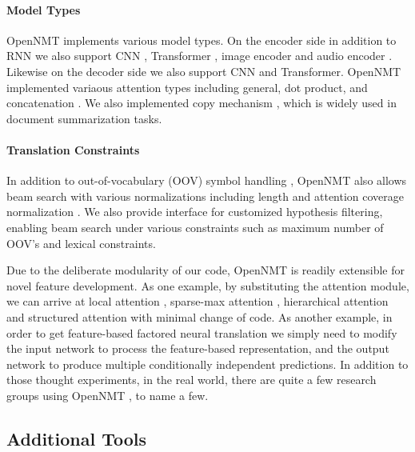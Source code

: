 \documentclass[]{article}
\begin{document}
\paragraph{Model Types} OpenNMT implements various model types. On the encoder side in addition to RNN we also support CNN \citep{gehring2017convolutional}, Transformer \citep{vaswani2017attention}, image encoder \citep{DBLP:conf/conll/BowmanVVDJB16,DBLP:journals/corr/DengKR16} and audio encoder \citep{DBLP:journals/corr/ChanJLV15}. Likewise on the decoder side we also support CNN and Transformer. OpenNMT implemented variaous attention types including general, dot product, and concatenation \citep{luong2015effective,britz2017massive}.
We also implemented copy mechanism \citep{vinyals2015pointer,gu2016incorporating}, which is widely used in document summarization tasks.
\paragraph{Translation Constraints} In addition to out-of-vocabulary (OOV) symbol handling \citep{Luong2015b}, OpenNMT also allows beam search with various normalizations including length and attention coverage normalization \citep{wu2016google}. We also provide interface for customized hypothesis filtering, enabling beam search under various constraints such as maximum number of OOV's and lexical constraints.


Due to the deliberate modularity of our code, OpenNMT is readily extensible for novel feature development. As one example, by substituting the attention module, we can arrive at local attention \citep{Luong2015}, sparse-max attention
\citep{martins2016softmax}, hierarchical attention \citep{yang2016hierarchical} and structured attention \citep{kim2017structured} with minimal change of code. As another example, in order to get feature-based factored neural translation \citep{sennrich2016linguistic} we simply need to modify the input network to process the feature-based representation, and the output network to produce multiple conditionally independent predictions. In addition to those thought experiments, in the real world, there are quite a few research groups using OpenNMT \citep{peters2017massively, levin2017toward, ha2017effective, sharaf2017umd, ameur2017arabic, sekizawa2017improving, ling2017coarse, ma2017osu, alvarez2017causal, van2017neural, gardent2017webnlg}, to name a few.


\subsection{Additional Tools}
\end{document}
